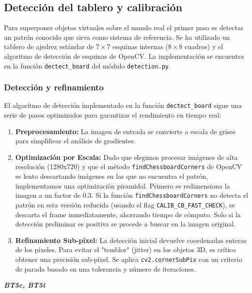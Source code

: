 \documentclass[11pt,a4paper]{article}
\begin{document}
\subsection{Detección del tablero y calibración}

Para superponer objetos virtuales sobre el mundo real 
el primer paso es detectar un patrón conocido que sirva como 
sistema de referencia. Se ha utilizado un tablero de ajedrez 
estándar de $7 \times 7$ esquinas internas ($8 \times 8$ cuadros)
y el algoritmo de detección de esquinas de OpenCV. La implementación se encuentra en la función \texttt{dectect\_board} del módulo \texttt{detection.py}.

\subsubsection{Detección y refinamiento}
El algoritmo de detección implementado en la función \texttt{dectect\_board} sigue una serie de pasos optimizados para garantizar el rendimiento en tiempo real:

\begin{enumerate}
    \item \textbf{Preprocesamiento:} La imagen de entrada se convierte a escala de grises para simplificar el análisis de gradientes.
    
    \item \textbf{Optimización por Escala:} Dado que elegimos procesar imágenes de alta resolución (1280x720) y que
    el método \texttt{findChessboardCorners} de OpenCV es lento descartando imágenes en las que no encuentra el patrón,
    implementamos una optimización piramidal. Primero se redimensiona la imagen a un factor de $0.3$. 
    Si la función \texttt{findChessboardCorners} no detecta el patrón en esta versión reducida (usando el flag \texttt{CALIB\_CB\_FAST\_CHECK}), 
    se descarta el frame inmediatamente, ahorrando tiempo de cómputo. Solo si la detección preliminar es 
    positiva se procede a buscar en la imagen original.
    
    \item \textbf{Refinamiento Sub-píxel:} La detección inicial devuelve 
    coordenadas enteras de los píxeles. Para evitar el "temblor" (jitter) en los objetos 3D, 
    es crítico obtener una precisión sub-píxel. Se aplica \texttt{cv2.cornerSubPix} con un 
    criterio de parada basado en una tolerancia y número de iteraciones.
\end{enumerate}

\textit{\textbf{BT5c, BT5i}}
\end{document}
